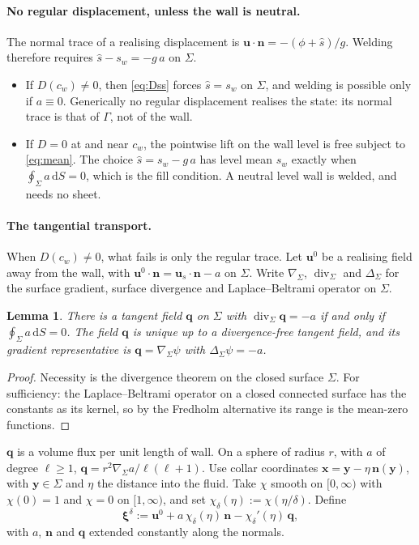 \documentclass[11pt]{article}
\newtheorem{lemma}{Lemma}
\theoremstyle{definition}
\theoremstyle{remark}
\newcommand{\bu}{\mathbf{u}}
\newcommand{\bn}{\mathbf{n}}
\newcommand{\bx}{\mathbf{x}}
\newcommand{\bq}{\mathbf{q}}
\newcommand{\bxi}{\boldsymbol{\xi}}
\newcommand{\dS}{\,\mathrm{d}S}
\newcommand{\divS}{\operatorname{div}_\Sigma}
\newcommand{\gradS}{\nabla_\Sigma}
\begin{document}
\paragraph{No regular displacement, unless the wall is neutral.} The
normal trace of a realising displacement is $\bu\cdot\bn = -(\phi +
\hat s)/g$. Welding therefore requires $\hat s - s_w = -g\,a$ on
$\Sigma$.
\begin{itemize}
\item If $D(c_w) \ne 0$, then \eqref{eq:Dss} forces $\hat s = s_w$ on
  $\Sigma$, and welding is possible only if $a \equiv 0$. Generically no
  regular displacement realises the state: its normal trace is that of
  $\Gamma$, not of the wall.
\item If $D = 0$ at and near $c_w$, the pointwise lift on the wall
  level is free subject to \eqref{eq:mean}. The choice $\hat s = s_w -
  g\,a$ has level mean $s_w$ exactly when $\oint_\Sigma a\dS = 0$, which
  is the fill condition. A neutral level wall is welded, and needs no
  sheet.
\end{itemize}

\paragraph{The tangential transport.} When $D(c_w) \ne 0$, what fails
is only the regular trace. Let $\bu^0$ be a realising field away from
the wall, with $\bu^0\cdot\bn = \bu_s\cdot\bn - a$ on $\Sigma$. Write
$\gradS$, $\divS$ and $\Delta_\Sigma$ for the surface gradient, surface
divergence and Laplace--Beltrami operator on $\Sigma$.

\begin{lemma}
\label{lem:q}
There is a tangent field $\bq$ on $\Sigma$ with $\divS\bq = -a$ if and
only if $\oint_\Sigma a\dS = 0$. The field $\bq$ is unique up to a
divergence-free tangent field, and its gradient representative is $\bq
= \gradS\psi$ with $\Delta_\Sigma\psi = -a$.
\end{lemma}
\begin{proof}
Necessity is the divergence theorem on the closed surface $\Sigma$. For
sufficiency: the Laplace--Beltrami operator on a closed connected
surface has the constants as its kernel, so by the Fredholm
alternative its range is the mean-zero functions.
\end{proof}

$\bq$ is a volume flux per unit length of wall. On a sphere of radius
$r$, with $a$ of degree $\ell \ge 1$, $\bq = r^2\gradS a/\ell(\ell +
1)$. Use collar coordinates $\bx = \mathbf y - \eta\,\bn(\mathbf y)$,
with $\mathbf y \in \Sigma$ and $\eta$ the distance into the fluid. Take
$\chi$ smooth on $[0, \infty)$ with $\chi(0) = 1$ and $\chi = 0$ on
$[1, \infty)$, and set $\chi_\delta(\eta) := \chi(\eta/\delta)$. Define
\begin{equation}
  \bxi^\delta := \bu^0 + a\,\chi_\delta(\eta)\,\bn - \chi_\delta'(\eta)\,\bq ,
  \label{eq:xidelta}
\end{equation}
with $a$, $\bn$ and $\bq$ extended constantly along the normals.
\end{document}
